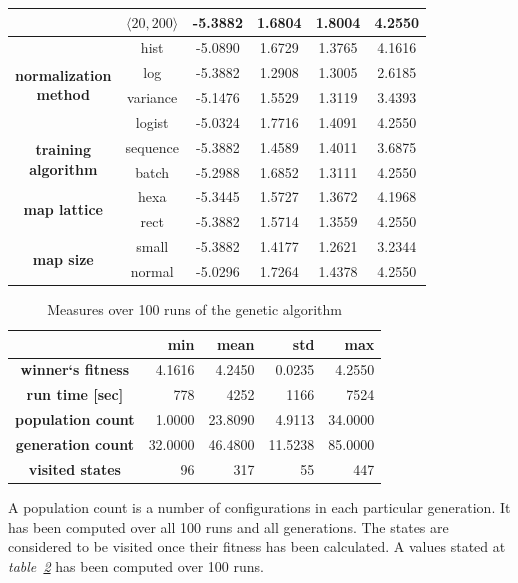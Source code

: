 \documentclass[a4paper]{IEEEtran}
\begin{document}
\begin{table}[!t]
\begin{tabular}{|c|c||c|c|c|c|}
			& $ \langle 20, 200 \rangle $ & -5.3882 & 1.6804 & 1.8004 & 4.2550\\
		\hline
			\multirow{4}{*}{\parbox[c]{20mm}{\centering\textbf{normalization}\\ \textbf{method}}}
			& hist & -5.0890 & 1.6729 & 1.3765 & 4.1616\\ \cline{2-6}
			& log & -5.3882 & 1.2908 & 1.3005 & 2.6185\\ \cline{2-6}
			& variance & -5.1476 & 1.5529 & 1.3119 & 3.4393\\ \cline{2-6}
			& logist & -5.0324 & 1.7716 & 1.4091 & 4.2550\\
		\hline
			\multirow{2}{*}{\parbox[c]{20mm}{\centering\textbf{training}\\ \textbf{algorithm}}}
			& sequence & -5.3882 & 1.4589 & 1.4011 & 3.6875\\ \cline{2-6}
			& batch & -5.2988 & 1.6852 & 1.3111 & 4.2550\\
		\hline
			\multirow{2}{*}{\textbf{map lattice}}
			& hexa & -5.3445 & 1.5727 & 1.3672 & 4.1968\\ \cline{2-6}
			& rect & -5.3882 & 1.5714 & 1.3559 & 4.2550\\
		\hline
			\multirow{2}{*}{\textbf{map size}}
			& small & -5.3882 & 1.4177 & 1.2621 & 3.2344\\ \cline{2-6}
			& normal & -5.0296 & 1.7264 & 1.4378 & 4.2550\\
		\hline
	\end{tabular}
	\label{tbl:somagrresults}
\end{table}
\begin{table}[!t]
	\caption{Measures over 100 runs of the genetic algorithm}
	\centering
	\begin{tabular}{|c||r|r|r|r|}
		\hline
			\textbf{} &  \textbf{min} & \textbf{mean} & \textbf{std} &  \textbf{max} \\
		\hline
		\hline
		\textbf{winner`s fitness} & 4.1616 & 4.2450 & 0.0235 & 4.2550 \\ \hline
		\textbf{run time [sec]} & 778 & 4252 & 1166 & 7524 \\ \hline
		\textbf{population count} & 1.0000 & 23.8090 & 4.9113 & 34.0000 \\ \hline
		\textbf{generation count} & 32.0000 & 46.4800 & 11.5238 & 85.0000 \\ \hline
		\textbf{visited states} & 96 & 317 & 55 & 447 \\ \hline
	\end{tabular}
	\label{tbl:garesults}
\end{table}
A population count is a number of configurations in each particular generation. It has been computed over 
all 100 runs and all generations.
The states are considered to be visited once their fitness has been calculated.
A values stated at \textit{table~\ref{tbl:garesults}} has been computed over 100 runs.
\end{document}
